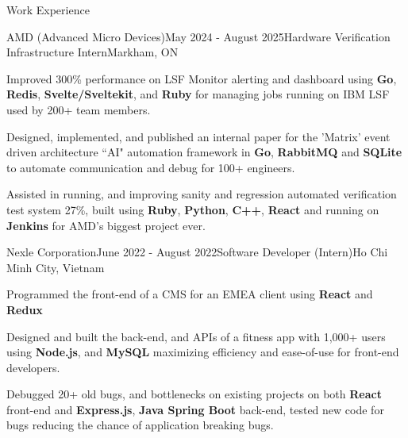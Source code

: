 \documentclass[
	11pt, %
]{resume} %
\begin{document}

\begin{rSection}{Work Experience}
	\begin{rSubsection}{AMD (Advanced Micro Devices)}{May 2024 - August 2025}{Hardware Verification Infrastructure Intern}{Markham, ON}
	\item Improved 300\% performance on LSF Monitor alerting and dashboard using \textbf{Go}, \textbf{Redis}, \textbf{Svelte/Sveltekit}, and \textbf{Ruby} for managing jobs running on IBM LSF used by 200+ team members.
	\item Designed, implemented, and published an internal paper for the 'Matrix' event driven architecture ``AI" automation framework in \textbf{Go}, \textbf{RabbitMQ} and \textbf{SQLite} to automate communication and debug for 100+ engineers.
  \item Assisted in running, and improving sanity and regression automated verification test system 27\%, built using \textbf{Ruby}, \textbf{Python}, \textbf{C++}, \textbf{React} and running on \textbf{Jenkins} for AMD's biggest project ever.
	\end{rSubsection}
	\begin{rSubsection}{Nexle Corporation}{June 2022 - August 2022}{Software Developer (Intern)}{Ho Chi Minh City, Vietnam}
		\item Programmed the front-end of a CMS for an EMEA client using \textbf{React} and \textbf{Redux}
		\item Designed and built the back-end, and APIs of a fitness app with 1,000+ users using \textbf{Node.js}, and \textbf{MySQL} maximizing efficiency and ease-of-use for front-end developers.
		\item Debugged 20+ old bugs, and bottlenecks on existing projects on both \textbf{React} front-end and \textbf{Express.js}, \textbf{Java Spring Boot} back-end, tested new code for bugs reducing the chance of application breaking bugs.
	\end{rSubsection}


\end{rSection}
\end{document}
